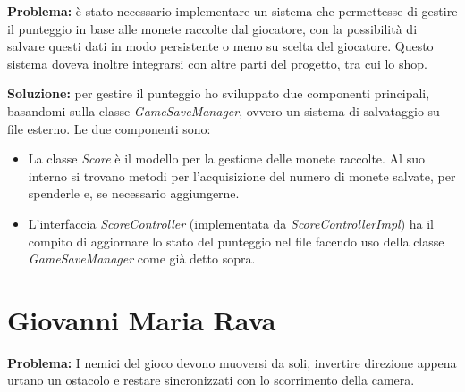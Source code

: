 \documentclass[a4paper,12pt]{report}
\begin{document}
\textbf{Problema:} è stato necessario implementare un sistema che permettesse di gestire il punteggio in base alle monete raccolte dal giocatore, con 
la possibilità di salvare questi dati in modo persistente o meno su scelta del giocatore. Questo sistema doveva inoltre integrarsi con altre parti del 
progetto, tra cui lo shop.

\textbf{Soluzione:} per gestire il punteggio ho sviluppato due componenti principali, basandomi sulla classe \emph{GameSaveManager}, ovvero un sistema di
salvataggio su file esterno. Le due componenti sono:
\begin{itemize}
    \item La classe \emph{Score} è il modello per la gestione delle monete raccolte. Al suo interno si trovano metodi per l'acquisizione del numero di monete
    salvate, per spenderle e, se necessario aggiungerne.
    \item L'interfaccia \emph{ScoreController} (implementata da \emph{ScoreControllerImpl}) ha il compito di aggiornare lo stato del punteggio nel file facendo 
    uso della classe \emph{GameSaveManager} come già detto sopra.
\end{itemize}

\section{Giovanni Maria Rava}
\textbf{Problema:} I nemici del gioco devono muoversi da soli, invertire direzione appena urtano un ostacolo e restare sincronizzati con 
lo scorrimento della camera. 
\end{document}
